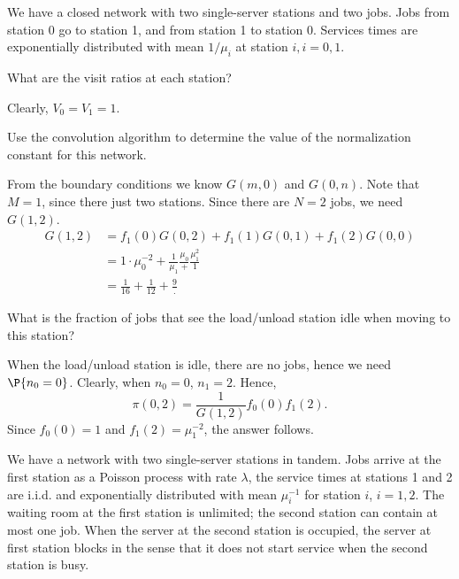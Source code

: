 We have a closed network with two single-server stations and two jobs. Jobs from station 0 go to station 1, and from station 1 to station 0.  Services times are exponentially distributed with mean $1/\mu_i$ at station $i, i=0,1$.

\begin{exercise}[201704]
What are the visit ratios at each station?
\begin{solution}
  Clearly, $V_0=V_1=1$.
\end{solution}
\end{exercise}

\begin{exercise}[201704]{2}
  Use the convolution algorithm to determine the value of the
  normalization constant for this network.
\begin{solution}
    From the boundary conditions we know $G(m, 0)$ and $G(0,n)$. Note
    that $M=1$, since there just two stations. Since there are $N=2$
    jobs, we need $G(1,2)$. 
    \begin{equation*}
      \begin{split}
      G(1,2) &= f_1(0) G(0, 2) + f_1(1) G(0, 1) + f_1(2) G(0,0) \\
       &= 1\cdot \mu_0^{-2}  + \frac1{\mu_1} \frac{\mu_0}  + \frac{\mu_1^2} 1 \\
       &= \frac 1{16} + \frac1{12}  + \frac{9}.
      \end{split}
    \end{equation*}
\end{solution}
\end{exercise}

\begin{exercise}[201704]
  What is the fraction of jobs that see the load/unload station idle
  when moving to this station?
\begin{solution}
    When the load/unload station is idle, there are no jobs, hence we need
      $\P{n_0=0}$. Clearly, when $n_0=0$, $n_1 = 2$. Hence,
    \begin{equation*}
\pi(0, 2) = \frac1{G(1,2)} f_0(0) f_1(2).
    \end{equation*}
Since $f_0(0) = 1$ and $f_1(2) = \mu_1^{-2}$, the answer follows.
\end{solution}
\end{exercise}

We have a network with two single-server stations in tandem. Jobs
arrive at the first station as a Poisson process with rate $\lambda$,
the service times at stations 1 and 2 are i.i.d. and exponentially
distributed with  mean $\mu_i^{-1}$ for station $i$, $i=1,2$. The waiting room at the first station is unlimited; the  second station can contain at most one job. When the server at the second station is occupied, the server at first station blocks in the sense that it does not start service when  the second station is busy. 

